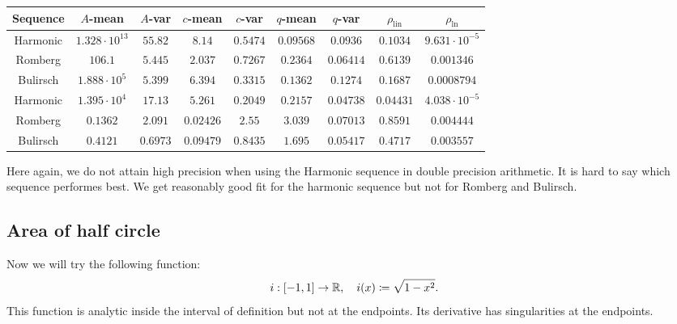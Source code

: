\begin{table}[H]
    \centering
    \small
    \begin{tabular}{c||c|c|c|c|c|c|c|c}
Sequence & \(A\)-mean & \(A\)-var & \(c\)-mean & \(c\)-var & \(q\)-mean & \(q\)-var & \(\rho_{\operatorname{lin}}\) & \(\rho_{\ln}\)\\\hline
\rowcolor{yellow}
Harmonic & \(1.328\cdot 10^{13}\) & \(55.82\) & \(8.14\) & \(0.5474\) & \(0.09568\) & \(0.0936\) & \(0.1034\) & \(9.631\cdot 10^{-5}\) \\
\rowcolor{red}
Romberg & \(106.1\) & \(5.445\) & \(2.037\) & \(0.7267\) & \(0.2364\) & \(0.06414\) & \(0.6139\) & \(0.001346\) \\
\rowcolor{red}
Bulirsch & \(1.888\cdot 10^5\) & \(5.399\) & \(6.394\) & \(0.3315\) & \(0.1362\) & \(0.1274\) & \(0.1687\) & \(0.0008794\) \\
\rowcolor{yellow}
Harmonic & \(1.395\cdot 10^4\) & \(17.13\) & \(5.261\) & \(0.2049\) & \(0.2157\) & \(0.04738\) & \(0.04431\) & \(4.038\cdot 10^{-5}\) \\
\rowcolor{red}
Romberg & \(0.1362\) & \(2.091\) & \(0.02426\) & \(2.55\) & \(3.039\) & \(0.07013\) & \(0.8591\) & \(0.004444\) \\
\rowcolor{red}
Bulirsch & \(0.4121\) & \(0.6973\) & \(0.09479\) & \(0.8435\) & \(1.695\) & \(0.05417\) & \(0.4717\) & \(0.003557\) \\
    \end{tabular}
    \label{tab:my_label}
\end{table}

Here again, we do not attain high precision when using the Harmonic sequence in double precision arithmetic. It is hard to say which sequence performes best. We get reasonably good fit for the harmonic sequence but not for Romberg and Bulirsch.

\subsection{Area of half circle}

Now we will try the following function:
\[
i: [-1, 1] \rightarrow \mathbb{R}, \quad i(x)\coloneqq \sqrt{1-x^2}.
\]
This function is analytic inside the interval of definition but not at the endpoints. Its derivative has singularities at the endpoints.

